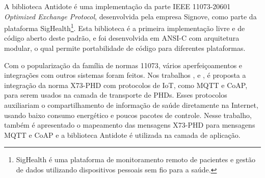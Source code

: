 A biblioteca Antidote é uma implementação da parte IEEE 11073-20601 \textit{Optimized Exchange Protocol}, desenvolvida pela empresa Signove, como parte da plataforma SigHealth\footnote{SigHealth é uma plataforma de monitoramento remoto de pacientes e gestão de dados utilizando dispositivos pessoais sem fio para a saúde.}. Esta biblioteca é a primeira implementação livre e de código aberto deste padrão, e foi desenvolvida em ANSI-C com arquitetura modular, o qual permite portabilidade de código para diferentes plataformas.

Com o popularização da família de normas 11073, vários aperfeiçoamentos e integrações com outros sistemas foram feitos. Nos trabalhos \cite{b7}, \cite{b8} e \cite{b9}, é proposta a integração da norma X73-PHD com protocolos de IoT, como MQTT e CoAP, para serem usados na camada de transporte de PHDs. Esses protocolos auxiliariam o compartilhamento de informação de saúde diretamente na Internet, usando baixo consumo energético e poucos pacotes de controle. Nesse trabalho, também é apresentado o mapeamento das mensagens X73-PHD para mensagens MQTT e CoAP e a biblioteca Antidote é utilizada na camada de aplicação.   

